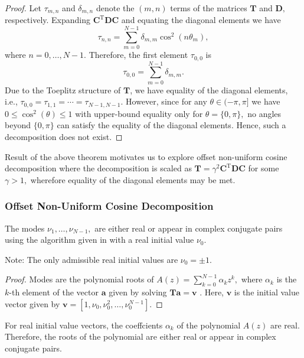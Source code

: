 \begin{proof}
Let $\tau_{m,n}$ and $\delta_{ m,n}$ denote the $(m,n)$ terms of the matrices $\boldsymbol{T}$ and $\boldsymbol{D},$ respectively. Expanding $\boldsymbol{C}^\text{T} \boldsymbol{D} \boldsymbol{C}$ and equating the diagonal elements we have \[ \tau_{n,n} = \sum_{m=0}^{N-1} \delta_{m,m} \cos^2 (n \theta_m),\]
where $n = 0,\dots,N-1.$ Therefore, the first element $\tau_{0,0}$ is \[\tau_{0,0} = \sum_{m=0}^{N-1} \delta_{m,m}.\] Due to the Toeplitz structure of $\boldsymbol{T}$, we have equality of the diagonal elements, i.e., $\tau_{0,0} = \tau_{1,1} = \cdots = \tau_{N-1,N-1}.$ However, since for any $\theta \in (-\pi,\pi]$ we have $0 \leq \cos^2 (\theta ) \leq 1$ with upper-bound equality only for $\theta = \{0,\pi\},$ no angles beyond $\{0,\pi\}$ can satisfy the equality of the diagonal elements. Hence, such a decomposition does not exist.
\end{proof}

Result of the above theorem motivates us to explore offset non-uniform cosine decomposition where the decomposition is scaled as $\boldsymbol{T} = \gamma^2 \boldsymbol{C}^\text{T} \boldsymbol{D} \boldsymbol{C}$ for some  $\gamma > 1,$ wherefore equality of the diagonal elements may be met.

\subsubsection{Offset Non-Uniform Cosine Decomposition}

\begin{lemma}
\label{lem:012_modes}
The modes $\nu_1, \dots, \nu_{N-1},$ are either real or appear in complex conjugate pairs using the algorithm given in \cite{Backstrom2013} with a real initial value $\nu_0.$
\end{lemma}

Note: The only admissible real initial values are $\nu_0 = \pm 1.$

\begin{proof}
Modes are the polynomial roots of $A(z) = \sum_{k=0}^{N-1} \alpha_k z^k,$ where $\alpha_ k$ is the $k$-th element of the vector $\boldsymbol{a}$ given by solving $\boldsymbol{Ta} = \boldsymbol{v}$ \cite{Backstrom2013}. Here, $\boldsymbol{v}$ is the initial value vector given by $\boldsymbol{v} = [1, \nu_0, \nu_0^2,\dots,\nu_0^{N-1}].$
\end{proof}

For real initial value vectors, the coeffcients $\alpha_k$ of the polynomial $A(z)$ are real. Therefore, the roots of the polynomial are either real or appear in complex conjugate pairs.

